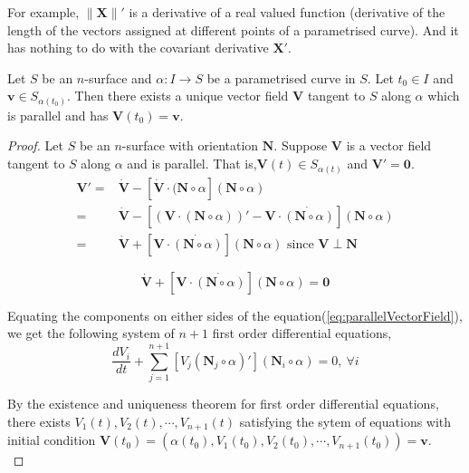 	For example, $\|\mathbf{X}\|'$ is a derivative of a real valued function (derivative of the length of the vectors assigned at different points of a parametrised curve). And it has nothing to do with the covariant derivative $\mathbf{X}'$.

\begin{theorem}
	Let $S$ be an $n$-surface and $\alpha : I \to S$ be a parametrised curve in $S$. Let $t_0 \in I$ and $\mathbf{v} \in S_{\alpha(t_0)}$. Then there exists a unique vector field $\mathbf{V}$ tangent to $S$ along $\alpha$ which is parallel and has $\mathbf{V}(t_0) = \mathbf{v}$.
\end{theorem}
\begin{proof}
	Let $S$ be an $n$-surface with orientation $\mathbf{N}$. Suppose $\mathbf{V}$ is a vector field tangent to $S$ along $\alpha$ and is parallel. That is,$\mathbf{V}(t) \in S_{\alpha(t)}$ and $\mathbf{V}' = \mathbf{0}$.
\begin{align*}
	\mathbf{V}' = & \dot{\mathbf{V}} - \left[ \dot{\mathbf{V}} \cdot (\mathbf{N} \circ \alpha \right] (\mathbf{N} \circ \alpha) \\
	= & \dot{\mathbf{V}} - \left[ \left(\mathbf{V} \cdot (\mathbf{N} \circ \alpha) \right)' - \mathbf{V} \cdot \dot{(\mathbf{N} \circ \alpha)} \right] (\mathbf{N} \circ \alpha) \\
	= & \dot{\mathbf{V}} + \left[ \mathbf{V} \cdot \dot{(\mathbf{N} \circ \alpha)} \right] (\mathbf{N} \circ \alpha) \text{ since } \mathbf{V} \perp \mathbf{N}
\end{align*}

\begin{equation}
	\dot{\mathbf{V}} + \left[ \mathbf{V} \cdot \dot{(\mathbf{N} \circ \alpha)} \right] (\mathbf{N} \circ \alpha) = \mathbf{0}
	\label{eq:parallelVectorField}
\end{equation}

	Equating the components on either sides of the equation(\ref{eq:parallelVectorField}), we get the following system of $n+1$ first order differential equations,
\begin{equation}
	\dfrac{dV_i}{dt} + \sum_{j = 1}^{n+1} \left[ V_j(\mathbf{N}_j \circ \alpha)' \right](\mathbf{N}_i \circ \alpha) = 0,\ \forall i
\end{equation}
	
	By the existence and uniqueness theorem for first order differential equations, there exists $V_1(t), V_2(t), \cdots, V_{n+1}(t)$ satisfying the sytem of equations with initial condition $\mathbf{V}(t_0) = \left( \alpha(t_0), V_1(t_0), V_2(t_0),\cdots,V_{n+1}(t_0) \right) = \mathbf{v}$.\\


\end{proof}
